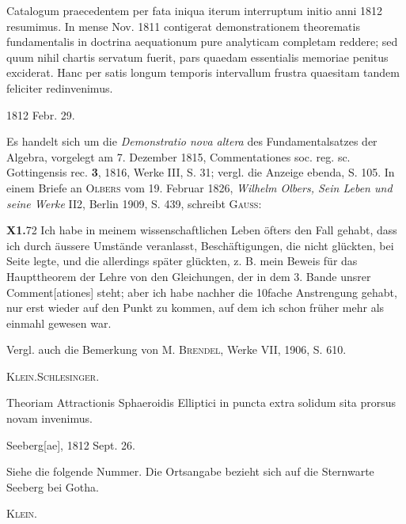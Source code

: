 \noindent\hspace*{\parindent}Catalogum praecedentem per fata iniqua iterum interruptum initio anni 1812 resumimus. In mense Nov. 1811 contigerat demonstrationem theorematis fundamentalis in doctrina aequationum pure analyticam completam reddere; sed quum nihil chartis servatum fuerit, pars quaedam essentialis memoriae penitus exciderat. Hanc per satis longum temporis intervallum frustra quaesitam tandem feliciter redinvenimus.
\par\noindent\hfill 1812 Febr. 29.
\par\medskip\begingroup\small
\noindent\hspace*{\parindent}Es handelt sich um die \textit{Demonstratio nova altera} des Fundamentalsatzes der Algebra, vorgelegt am 7. Dezember 1815, Commentationes soc. reg. sc. Gottingensis rec. \textbf{3}, 1816, Werke III, S. 31; vergl. die Anzeige ebenda, S. 105. In einem Briefe an \textsc{Olbers} vom 19. Februar 1826, \textit{Wilhelm Olbers, Sein Leben und seine Werke} II2, Berlin 1909, S. 439, schreibt \textsc{Gauss}:
\par\endgroup
\par\medskip\noindent\textbf{X1.}\hfill72
\clearpage{}
\noindent\hspace*{\parindent}Ich habe in meinem wissenschaftlichen Leben öfters den Fall gehabt, dass ich durch äussere Umstände veranlasst, Beschäftigungen, die nicht glückten, bei Seite legte, und die allerdings später glückten, z. B. mein Beweis für das Haupttheorem der Lehre von den Gleichungen, der in dem 3. Bande unsrer Comment[ationes] steht; aber ich habe nachher die 10fache Anstrengung gehabt, nur erst wieder auf den Punkt zu kommen, auf dem ich schon früher mehr als einmahl gewesen war.
\par\begingroup\small
\noindent\hspace*{\parindent}Vergl. auch die Bemerkung von M. \textsc{Brendel}, Werke VII, 1906, S. 610.
\par\noindent\hfill\textsc{Klein.\quad Schlesinger.}
\par\endgroup

\noindent\hspace*{\parindent}Theoriam Attractionis Sphaeroidis Elliptici in puncta extra solidum sita prorsus novam invenimus.
\par\noindent\hfill Seeberg[ae], 1812 Sept. 26.
\par\medskip\begingroup\small
\noindent\hspace*{\parindent}Siehe die folgende Nummer. Die Ortsangabe bezieht sich auf die Sternwarte Seeberg bei Gotha.
\par\noindent\hfill\textsc{Klein.}
\par\endgroup

